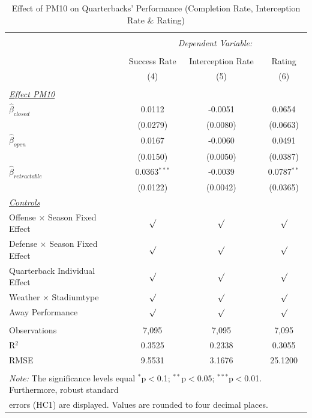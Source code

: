 \documentclass[12pt,a4paper]{article}
\begin{document}
{\clearpage
\begin{table}[!htbp] \centering 
  \caption{Effect of PM10 on Quarterbacks' Performance (Completion Rate, Interception Rate \& Rating)} 
  \label{T1} 
\begin{tabular}{@{\extracolsep{5pt}}lccc} 
\\[-1.8ex]\hline 
\hline \\[-1.8ex] 
 & \multicolumn{3}{c}{\textit{Dependent Variable:}} \\ \cline{2-4} \\ [-1.8ex]
 & Success Rate & Interception Rate & Rating \\ 
  & (4) & (5) & (6)\\ \hline \\[-1.8ex] 
 \underline{\textit{Effect PM10}}\\[0.4cm]
  $\hat{\beta}_{closed}$& 0.0112  & -0.0051 & 0.0654 \\ 
  & (0.0279)  & (0.0080)& (0.0663) \\[0.4cm]
  $\hat{\beta}_{open}$&  0.0167 & -0.0060 & 0.0491\\ 
  & (0.0150) & (0.0050) & (0.0387) \\[0.4cm]
  $\hat{\beta}_{retractable}$& 0.0363$^{***}$ & -0.0039 & 0.0787$^{**}$\\ 
  & (0.0122) & (0.0042) & (0.0365)\\ [0.4cm]
  \underline{\textit{Controls}} \\[0.4cm]
  Offense $\times$ Season Fixed Effect & $\surd$ & $\surd$ & $\surd$ \\[0.4cm]
   Defense $\times$ Season Fixed Effect & $\surd$ & $\surd$  & $\surd$ \\[0.4cm]
    Quarterback Individual Effect & $\surd$ & $\surd$ & $\surd$  \\[0.4cm]
    Weather $\times $ Stadiumtype & $\surd$ & $\surd$ & $\surd$ \\[0.4cm]
    Away Performance & $\surd$ & $\surd$ & $\surd$\\
\hline \\[-1.8ex] 
Observations & 7,095 & 7,095 & 7,095 \\ 
R$^{2}$ & 0.3525 & 0.2338   &  0.3055 \\ 
RMSE & 9.5531 & 3.1676  & 25.1200 \\ \hline 
\hline \\[-1.8ex] 
\multicolumn{4}{l}{\footnotesize \textit{Note:} The significance levels equal {$^{*}$p$<$0.1; $^{**}$p$<$0.05; $^{***}$p$<$0.01}.  Furthermore, robust  standard} \\ \multicolumn{4}{l}{\footnotesize errors (HC1) are displayed. Values are rounded to four decimal places.}
  \end{tabular}
\end{table} 
}
\end{document}
